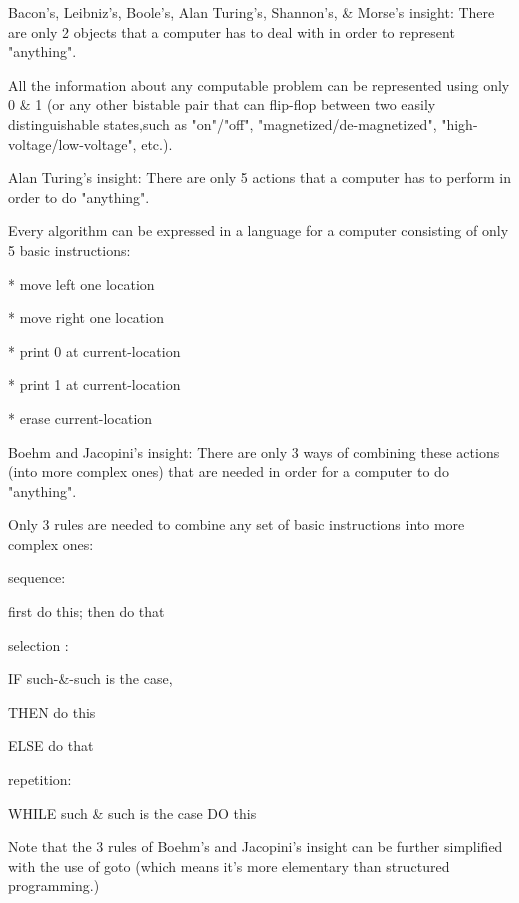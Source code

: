 \begin{compactitem}
\item Bacon's, Leibniz's, Boole's, Alan Turing's, Shannon's, \& Morse's insight: There are only 2 objects that a computer has to deal with in order to represent "anything".

All the information about any computable problem can be represented using only 0 \& 1 (or any other bistable pair that can flip-flop between two easily distinguishable states,such as "on"/"off", "magnetized/de-magnetized", "high-voltage/low-voltage", etc.).


\item Alan Turing's insight: There are only 5 actions that a computer has to perform in order to do "anything".

Every algorithm can be expressed in a language for a computer consisting of only 5 basic instructions:

* move left one location

* move right one location

* print 0 at current-location

* print 1 at current-location

* erase current-location


\item Boehm and Jacopini's insight: There are only 3 ways of combining these actions (into more complex ones) that are needed in order for a computer to do "anything".

Only 3 rules are needed to combine any set of basic instructions into more complex ones:


\begin{compactitem}
\item sequence:

first do this; then do that

\item selection :

IF such-\&-such is the case,

THEN do this

ELSE do that

\item repetition:

WHILE such \& such is the case DO this


\end{compactitem}

Note that the 3 rules of Boehm's and Jacopini's insight can be further simplified with the use of goto (which means it's more elementary than structured programming.)

\end{compactitem}



